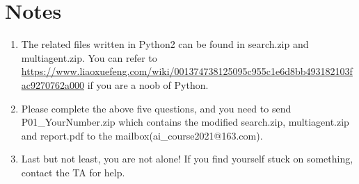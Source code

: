 \documentclass[a4paper, 11pt]{article}
\begin{document}
\section{Notes}
\begin{enumerate}\setlength{\itemsep}{-\itemsep}
  \item The related files written in Python2 can be found in \textsf{search.zip} and \textsf{multiagent.zip}. You can refer to \url{https://www.liaoxuefeng.com/wiki/001374738125095c955c1e6d8bb493182103fac9270762a000} if you are a noob of Python.
\item Please complete the above five questions, and you need to send \textsf{P01\_YourNumber.zip} which contains the modified \textsf{search.zip}, \textsf{multiagent.zip} and \textsf{report.pdf} to the mailbox(\textsf{ai\_course2021@163.com}).
\item Last but not least, you are not alone! If you find yourself stuck on something, contact the TA for help.
  
\end{enumerate}
  
\end{document}
